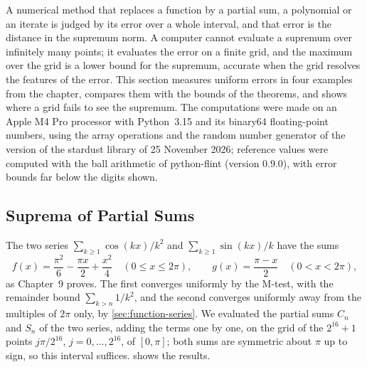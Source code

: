 A numerical method that replaces a function by a partial sum, a polynomial or an iterate is judged by its error over a whole interval, and that error is the distance in the supremum norm. A computer cannot evaluate a supremum over infinitely many points; it evaluates the error on a finite grid, and the maximum over the grid is a lower bound for the supremum, accurate when the grid resolves the features of the error. This section measures uniform errors in four examples from the chapter, compares them with the bounds of the theorems, and shows where a grid fails to see the supremum. The computations were made on an Apple M4 Pro processor with Python~3.15 and its binary64 floating-point numbers, using the array operations and the random number generator of the version of the stardust library of 25 November 2026; reference values were computed with the ball arithmetic of python-flint (version 0.9.0), with error bounds far below the digits shown.

\subsection{Suprema of Partial Sums}

The two series $\sum_{k\ge1}\cos(kx)/k^2$ and $\sum_{k\ge1}\sin(kx)/k$ have the sums
\[
f(x)=\frac{\pi^2}6-\frac{\pi x}2+\frac{x^2}4\quad(0\le x\le2\pi),\qquad g(x)=\frac{\pi-x}2\quad(0<x<2\pi),
\]
as Chapter~9 proves. The first converges uniformly by the M-test, with the remainder bound $\sum_{k>n}1/k^2$, and the second converges uniformly away from the multiples of $2\pi$ only, by \cref{sec:function-series}. We evaluated the partial sums $C_n$ and $S_n$ of the two series, adding the terms one by one, on the grid of the $2^{16}+1$ points $j\pi/2^{16}$, $j=0,\ldots,2^{16}$, of $[0,\pi]$; both sums are symmetric about $\pi$ up to sign, so this interval suffices.  shows the results.

